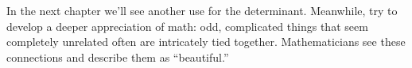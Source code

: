 \medskip


In the next chapter we'll see another use for the determinant. Meanwhile, try to develop a deeper appreciation of math: odd, complicated things that seem completely unrelated often are intricately tied together. Mathematicians see these connections and describe them as ``beautiful.''


